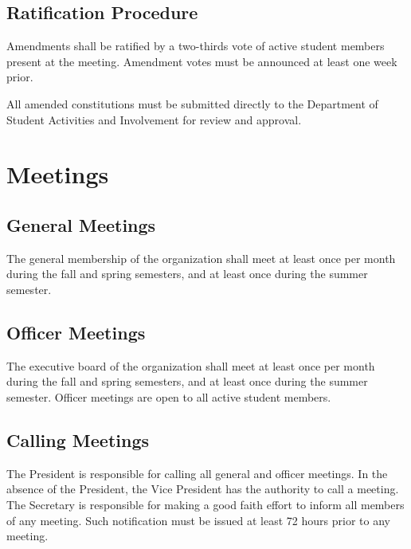 \documentclass{article}
\begin{document}
\subsection{Ratification Procedure}
Amendments shall be ratified by a two-thirds vote of active student members present at the meeting. Amendment votes must be announced at least one week prior. 

All amended constitutions must be submitted directly to the Department of Student Activities and Involvement for review and approval. 



\section{Meetings}
\subsection{General Meetings}
The general membership of the organization shall meet at least once per month during the fall and spring semesters, and at least once during the summer semester.

\subsection{Officer Meetings}
The executive board of the organization shall meet at least once per month during the fall and spring semesters, and at least once during the summer semester. Officer meetings are open to all active student members.

\subsection{Calling Meetings}
The President is responsible for calling all general and officer meetings. In the absence of the President, the Vice President has the authority to call a meeting. The Secretary is responsible for making a good faith effort to inform all members of any meeting. Such notification must be issued at least 72 hours prior to any meeting.
\end{document}
